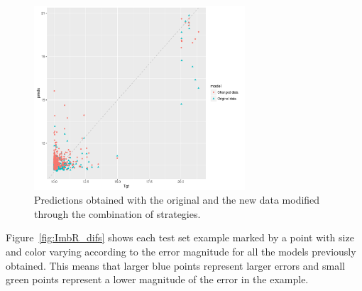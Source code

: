\documentclass[10pt,a4paper]{article}\usepackage[]{graphicx}\usepackage[]{color}
\newenvironment{knitrout}{}{} %
\begin{document}
\begin{knitrout}\footnotesize
{}\color{fgcolor}\begin{figure}

{\centering \includegraphics[width=0.7\textwidth]{figures/UBL-ImbR_Comb1-1} 

}

\caption[Predictions obtained with the original and the new data modified through the combination of strategies]{Predictions obtained with the original and the new data modified through the combination of strategies.}\label{fig:ImbR_Comb1}
\end{figure}


\end{knitrout}



Figure~\ref{fig:ImbR_difs} shows each test set example marked by a point with size and color varying according to the error magnitude for all the models previously obtained. This means that larger blue points represent larger errors and small green points represent a lower magnitude of the error in the example. 
\end{document}
